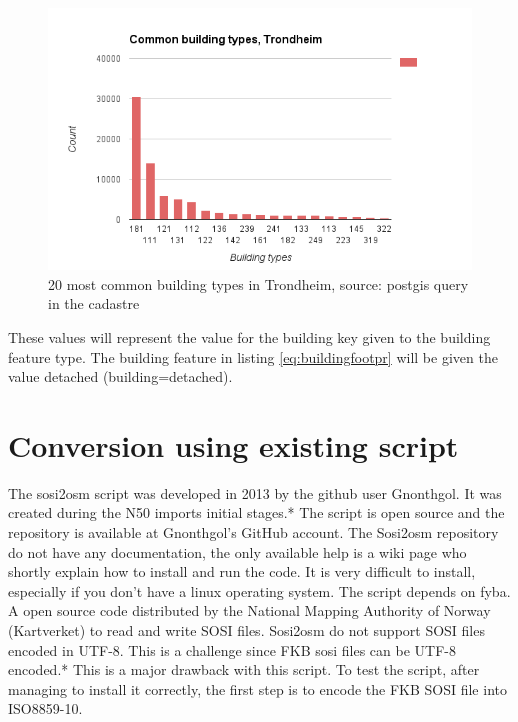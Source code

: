 \begin{figure}[H]
    \centering
    \includegraphics[scale=0.5]{figures/FixedByMe/buildtypestrd.png}
    \caption{20 most common building types in Trondheim, source: postgis query in the cadastre} 
    \label{fig:buildtypTrd}
\end{figure}

These values will represent the value for the building key given to the building feature type. The building feature in listing \ref{eq:buildingfootpr} will be given the value detached (building=detached).  


\section{Conversion using existing script}

The sosi2osm script was developed in 2013 by the github user Gnonthgol. It was created during the N50 imports initial stages.*%
 The script is open source and the repository is available at Gnonthgol's GitHub account. The Sosi2osm repository do not have any documentation, the only available help is a wiki page who shortly explain how to install and run the code. It is very difficult to install, especially if you don't have a linux operating system. The script depends on fyba. A open source code distributed by the National Mapping Authority of Norway (Kartverket) to read and write SOSI files. Sosi2osm do not support SOSI files encoded in UTF-8. This is a challenge since FKB sosi files can be UTF-8 encoded.*%
 This is a major drawback with this script. To test the script, after managing to install it correctly, the first step is to encode the FKB SOSI file into ISO8859-10. %

